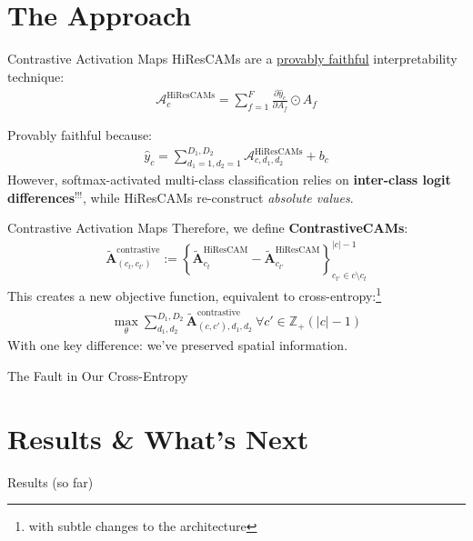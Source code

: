 \documentclass{beamer}
\begin{document}
\section{The Approach}
\begin{frame}{Contrastive Activation Maps}
	HiResCAMs are a \underline{provably faithful} interpretability technique:
	\begin{gather}
		\mathcal{A}^{\text{HiResCAMs}}_{c} = \sum^{F}_{f=1} \frac{\partial \hat{y}_c}{\partial A_f} \odot A_f
	\end{gather} \pause

	Provably faithful because:
	\begin{gather}
		\hat{y}_c = \sum^{D_1, D_2}_{d_1 = 1, d_2 = 1} \mathcal{A}^{\text{HiResCAMs}}_{c, d_1, d_2} + b_c
	\end{gather} \pause
	However, softmax-activated multi-class classification relies on \textbf{inter-class logit differences${}^{!!!}$}, while HiResCAMs re-construct \textit{absolute values}.
\end{frame}

\begin{frame}{Contrastive Activation Maps}
	Therefore, we define \textbf{ContrastiveCAMs}:
	\begin{gather}
			\tilde{\mathcal{\bm{A}}}^{\text{contrastive}}_{(c_t, c_{t'})} := \left\{\tilde{\mathcal{\bm{A}}}_{c_t}^{\text{HiResCAM}} - \tilde{\mathcal{\bm{A}}}_{c_{t'}}^{\text{HiResCAM}}\right\}^{|c|-1}_{c_{t'} \in c \setminus c_t}
	\end{gather}
	This creates a new objective function, equivalent to cross-entropy:\footnote{with subtle changes to the architecture}
	\begin{gather}
		\max_{\theta} \sum^{D_1,D_2}_{d_1,d_2}\tilde{\mathcal{\bm{A}}}_{(c, c'),d_1,d_2}^{\text{contrastive}}\ \forall c' \in \mathbb{Z}_{+}(|c| - 1)
	\end{gather}
	With one key difference: we've preserved spatial information.
\end{frame}

\begin{frame}{The Fault in Our Cross-Entropy}
\end{frame}

\section{Results \& What's Next}
\begin{frame}{Results (so far)}
\end{frame}
\end{document}
